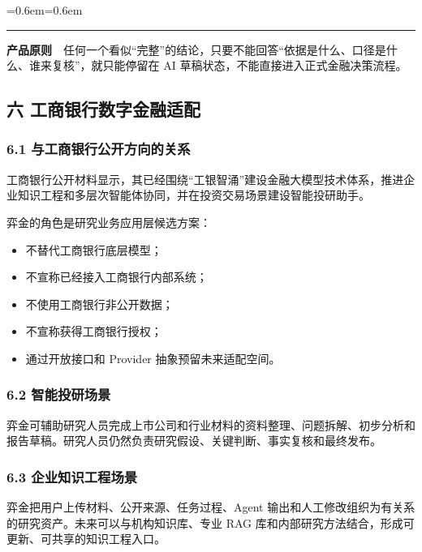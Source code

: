 \documentclass[a4paper,12pt,fontset=none]{ctexart}
\renewenvironment{quote}{%
  \par\vspace{0.45em}%
  \leftskip=0.6em\rightskip=0.6em
  \noindent\color{icbcred}\rule{3pt}{1.15em}\hspace{0.55em}%
  \small\color{deepnavy!85}\itshape\ignorespaces
}{%
  \par\vspace{0.45em}%
}
\begin{document}
\begin{quote}
\textbf{产品原则}　任何一个看似``完整''的结论，只要不能回答``依据是什么、口径是什么、谁来复核''，就只能停留在
AI 草稿状态，不能直接进入正式金融决策流程。
\end{quote}

\subsection{六
工商银行数字金融适配}\label{ux516d-ux5de5ux5546ux94f6ux884cux6570ux5b57ux91d1ux878dux9002ux914d}

\subsubsection{6.1
与工商银行公开方向的关系}\label{ux4e0eux5de5ux5546ux94f6ux884cux516cux5f00ux65b9ux5411ux7684ux5173ux7cfb}

工商银行公开材料显示，其已经围绕``工银智涌''建设金融大模型技术体系，推进企业知识工程和多层次智能体协同，并在投资交易场景建设智能投研助手。

弈金的角色是研究业务应用层候选方案：

\begin{itemize}
\tightlist
\item
  不替代工商银行底层模型；
\item
  不宣称已经接入工商银行内部系统；
\item
  不使用工商银行非公开数据；
\item
  不宣称获得工商银行授权；
\item
  通过开放接口和 Provider 抽象预留未来适配空间。
\end{itemize}

\subsubsection{6.2
智能投研场景}\label{ux667aux80fdux6295ux7814ux573aux666f}

弈金可辅助研究人员完成上市公司和行业材料的资料整理、问题拆解、初步分析和报告草稿。研究人员仍然负责研究假设、关键判断、事实复核和最终发布。

\subsubsection{6.3
企业知识工程场景}\label{ux4f01ux4e1aux77e5ux8bc6ux5de5ux7a0bux573aux666f}

弈金把用户上传材料、公开来源、任务过程、Agent
输出和人工修改组织为有关系的研究资产。未来可以与机构知识库、专业 RAG
库和内部研究方法结合，形成可更新、可共享的知识工程入口。
\end{document}
